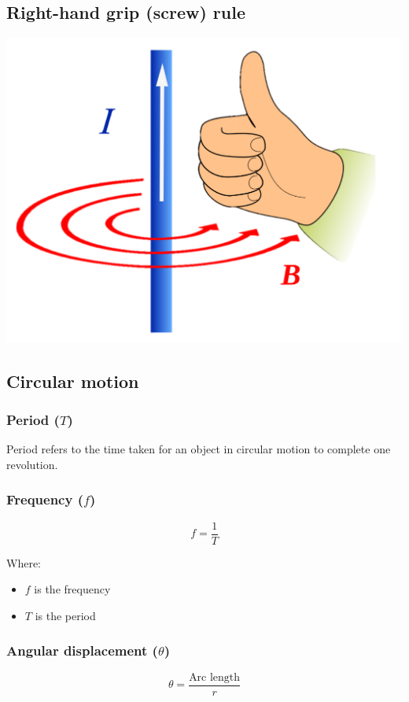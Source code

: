 \documentclass[11pt]{article}
\begin{document}
\subsection{Right-hand grip (screw) rule}
\label{sec:org90eb84e}
\begin{center}
\includegraphics[width=.9\linewidth]{./images/right-hand-grip-rule.png}
\end{center}

\subsection{Circular motion}
\label{sec:orgea54ba8}

\subsubsection{Period (\(T\))}
\label{sec:org339ba01}
Period refers to the time taken for an object in circular motion to complete one revolution.

\subsubsection{Frequency (\(f\))}
\label{sec:orgb0f3c5e}
\[f = \frac{1}{T}\]

Where:
\begin{itemize}
\item \(f\) is the frequency
\item \(T\) is the period
\end{itemize}

 \newpage

\subsubsection{Angular displacement (\(\theta\))}
\label{sec:org0af97bf}
\[\theta = \frac{\text{Arc length}}{r}\]
\end{document}
